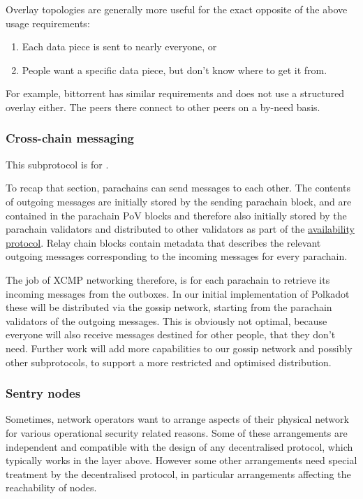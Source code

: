 Overlay topologies are generally more useful for the exact opposite of the
above usage requirements:

\begin{enumerate}
\item Each data piece is sent to nearly everyone, or
\item People want a specific data piece, but don't know where to get it from.
\end{enumerate}

For example, bittorrent has similar requirements and does not use a structured
overlay either. The peers there connect to other peers on a by-need basis.

\subsubsection{Cross-chain messaging} \label{sec:net_crosschain}

This subprotocol is for .

To recap that section, parachains can send messages to each other. The contents
of outgoing messages are initially stored by the sending parachain block, and
are contained in the parachain PoV blocks and therefore also initially stored
by the parachain validators and distributed to other validators as part of the
\hyperref[sec:net_storage]{availability protocol}. Relay chain blocks contain
metadata that describes the relevant outgoing messages corresponding to the
incoming messages for every parachain.

The job of XCMP networking therefore, is for each parachain to retrieve its
incoming messages from the outboxes. In our initial implementation of Polkadot
these will be distributed via the gossip network, starting from the parachain
validators of the outgoing messages. This is obviously not optimal, because
everyone will also receive messages destined for other people, that they don't
need. Further work will add more capabilities to our gossip network and
possibly other subprotocols, to support a more restricted and optimised
distribution.

\subsubsection{Sentry nodes} \label{sec:net_sentry}

Sometimes, network operators want to arrange aspects of their physical network
for various operational security related reasons. Some of these arrangements
are independent and compatible with the design of any decentralised protocol,
which typically works in the layer above. However some other arrangements need
special treatment by the decentralised protocol, in particular arrangements
affecting the reachability of nodes.

